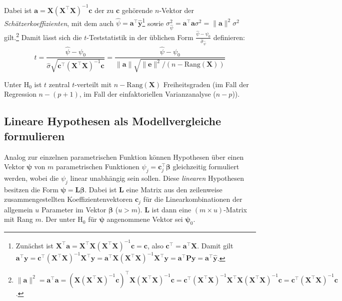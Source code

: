 Dabei ist $\bm{a} = \bm{X} (\bm{X}^{\top} \bm{X})^{-1} \bm{c}$ der zu $\bm{c}$ gehörende $n$-Vektor der \emph{Schätzerkoeffizienten}, mit dem auch $\hat{\psi} = \bm{a}^{\top} \hat{\bm{y}}$\footnote{\label{ftn:estCoef}Zunächst ist $\bm{X}^{\top} \bm{a} = \bm{X}^{\top} \bm{X} (\bm{X}^{\top} \bm{X})^{-1} \bm{c} = \bm{c}$, also $\bm{c}^{\top} = \bm{a}^{\top} \bm{X}$. Damit gilt $\bm{a}^{\top} \bm{y} = \bm{c}^{\top} (\bm{X}^{\top} \bm{X})^{-1} \bm{X}^{\top} \bm{y} = \bm{a}^{\top} \bm{X} (\bm{X}^{\top} \bm{X})^{-1} \bm{X}^{\top} \bm{y} = \bm{a}^{\top} \bm{P} \bm{y} = \bm{a}^{\top} \hat{\bm{y}}$.} sowie $\sigma^{2}_{\hat{\psi}} = \bm{a}^{\top} \bm{a} \sigma^{2} = \|\bm{a}\|^{2} \sigma^{2}$ gilt.\footnote{$\|\bm{a}\|^{2} = \bm{a}^{\top} \bm{a} = (\bm{X} (\bm{X}^{\top} \bm{X})^{-1} \bm{c})^{\top} \bm{X} (\bm{X}^{\top} \bm{X})^{-1} \bm{c} = \bm{c}^{\top} (\bm{X}^{\top} \bm{X})^{-1} \bm{X}^{\top} \bm{X} (\bm{X}^{\top} \bm{X})^{-1} \bm{c} = \bm{c}^{\top} (\bm{X}^{\top} \bm{X})^{-1} \bm{c}$.} Damit lässt sich die $t$-Teststatistik in der üblichen Form $\frac{\hat{\psi} - \psi_{0}}{\hat{\sigma}_{\hat{\psi}}}$ definieren:
\begin{equation*}
t = \frac{\hat{\psi} - \psi_{0}}{\hat{\sigma} \sqrt{\bm{c}^{\top} (\bm{X}^{\top} \bm{X})^{-1} \bm{c}}} = \frac{\hat{\psi} - \psi_{0}}{\|\bm{a}\| \sqrt{\|\bm{e}\|^{2} / (n - \text{Rang}(\bm{X}))}}
\end{equation*}

Unter $\text{H}_{0}$ ist $t$ zentral $t$-verteilt mit $n - \text{Rang}(\bm{X})$ Freiheitsgraden (im Fall der Regression $n - (p+1)$, im Fall der einfaktoriellen Varianzanalyse ($n-p$)).

\subsection{Lineare Hypothesen als Modellvergleiche formulieren}
\label{sec:multALMmodCmp}

Analog zur einzelnen parametrischen Funktion können Hypothesen über einen Vektor $\bm{\psi}$ von $m$ parametrischen Funktionen $\psi_{j} = \bm{c}_{j}^{\top} \bm{\beta}$ gleichzeitig formuliert werden, wobei die $\psi_{j}$ linear unabhängig sein sollen. Diese \emph{linearen} Hypothesen besitzen die Form $\bm{\psi} = \bm{L} \bm{\beta}$. Dabei ist $\bm{L}$ eine Matrix aus den zeilenweise zusammengestellten Koeffizientenvektoren $\bm{c}_{j}$ für die Linearkombinationen der allgemein $u$ Parameter im Vektor $\bm{\beta}$ ($u > m$). $\bm{L}$ ist dann eine $(m \times u)$-Matrix mit Rang $m$. Der unter $\text{H}_{0}$ für $\bm{\psi}$ angenommene Vektor sei $\bm{\psi}_{0}$.

